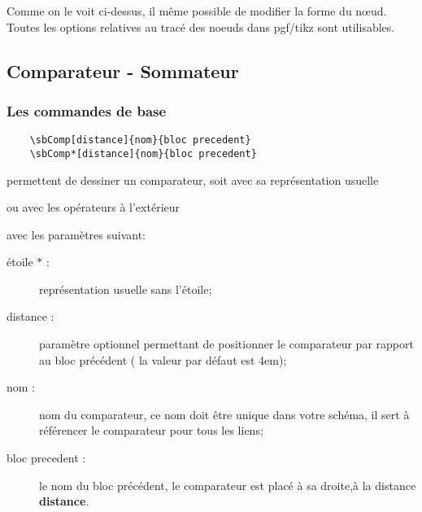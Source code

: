 \documentclass[a4paper,11pt]{article}                      %
\begin{document}
Comme on le voit ci-dessus, il même possible de modifier la forme du n\oe ud. Toutes les options relatives au tracé des noeuds dans pgf/tikz sont utilisables.


\subsection{Comparateur - Sommateur}
\subsubsection{Les commandes de base}

\begin{verbatim}
    \sbComp[distance]{nom}{bloc precedent}
    \sbComp*[distance]{nom}{bloc precedent}
\end{verbatim}

permettent de dessiner un comparateur, soit avec sa représentation usuelle 
ou avec les opérateurs à l'extérieur
 avec les paramètres suivant:




\begin{description}
\item [étoile $*$ : ] représentation usuelle sans l'étoile;
\item [distance : ] paramètre optionnel permettant de positionner le comparateur par rapport au bloc précédent ( la valeur par défaut est 4em);
\item [nom :] nom du comparateur, ce nom doit être unique dans votre schéma, il sert à référencer le comparateur pour tous les liens;
\item [bloc precedent :] le nom du bloc précédent, le comparateur est placé à sa droite,à la distance \textbf{distance}.
\end{description}
\end{document}
